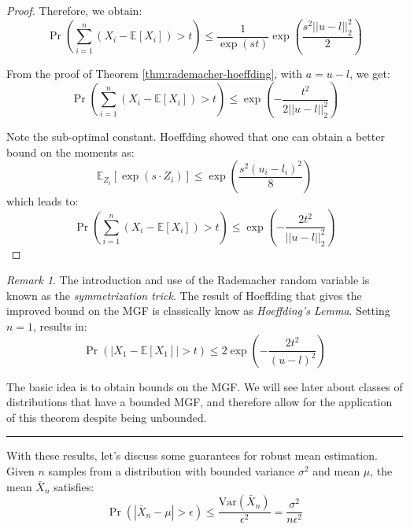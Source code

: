 \documentclass{article}
\theoremstyle{remark}
\newtheorem*{remark}{Remark}
\newcommand{\comprule}{\textcolor[RGB]{220,220,220}{\rule{\linewidth}{0.2pt}}}
\newcommand{\Exp}{\mathbb{E}}
\newcommand{\Var}{\mathrm{Var}}
\begin{document}
\begin{proof}
Therefore, we obtain:
\begin{equation*}
\Pr\left(\sum_{i=1}^{n}(X_{i} - \Exp[X_{i}]) > t\right) \leq \frac{1}{\exp(st)}\exp\left(\frac{s^{2}||u - l||_{2}^{2}}{2}\right)
\end{equation*}

From the proof of Theorem \ref{thm:rademacher-hoeffding}, with \(a = u - l\), we get:
\begin{equation*}
\Pr\left(\sum_{i=1}^{n}(X_{i} - \Exp[X_{i}]) > t\right) \leq \exp\left(-\frac{t^{2}}{2||u - l||_{2}^{2}}\right)
\end{equation*}

Note the sub-optimal constant. Hoeffding showed that one can obtain a better bound on the moments as:
\begin{equation*}
\Exp_{Z_{i}}\left[\exp(s \cdot Z_{i})\right] \leq \exp\left(\frac{s^{2}(u_{i} - l_{i})^{2}}{8}\right)
\end{equation*}
which leads to:
\begin{equation*}
\Pr\left(\sum_{i=1}^{n}(X_{i} - \Exp[X_{i}]) > t\right) \leq \exp\left(-\frac{2t^{2}}{||u - l||_{2}^{2}}\right)
\end{equation*}

\end{proof}

\begin{remark}
The introduction and use of the Rademacher random variable is known as the \emph{symmetrization trick}. The result of Hoeffding that gives the improved bound on the MGF is classically know as \emph{Hoeffding's Lemma}. Setting \(n = 1\), results in:
\begin{equation*}
\Pr\left(|X_{1} - \Exp[X_{1}]| > t\right) \leq 2\exp\left(-\frac{2t^{2}}{(u - l)^{2}}\right)
\end{equation*}

The basic idea is to obtain bounds on the MGF. We will see later about classes of distributions that have a bounded MGF, and therefore allow for the application of this theorem despite being unbounded.
\end{remark}

\comprule

With these results, let's discuss some guarantees for robust mean estimation. Given \(n\) samples from a distribution with bounded variance \(\sigma^{2}\) and mean \(\mu\), the mean \(\bar{X}_{n}\) satisfies:
\begin{equation*}
\Pr\left(|\bar{X}_{n} - \mu| > \epsilon\right) \leq \frac{\Var(\bar{X}_{n})}{\epsilon^{2}} = \frac{\sigma^{2}}{n\epsilon^{2}}
\end{equation*}
\end{document}
